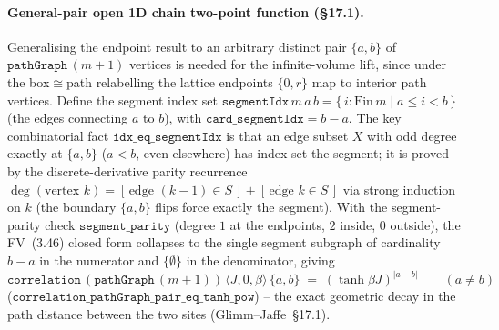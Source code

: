 \documentclass[a4paper,11pt]{article}
\begin{document}
\paragraph{General-pair open 1D chain two-point function (\S17.1).}
Generalising the endpoint result to an arbitrary distinct pair $\{a,b\}$ of
$\texttt{pathGraph}\,(m{+}1)$ vertices is needed for the infinite-volume lift, since
under the box$\cong$path relabelling the lattice endpoints $\{0,r\}$ map to interior
path vertices.  Define the segment index set
$\texttt{segmentIdx}\,m\,a\,b = \{\, i : \mathrm{Fin}\,m \mid a \le i < b \,\}$ (the
edges connecting $a$ to $b$), with $\texttt{card\_segmentIdx} = b - a$.  The key
combinatorial fact $\texttt{idx\_eq\_segmentIdx}$ is that an edge subset $X$ with odd
degree exactly at $\{a,b\}$ ($a < b$, even elsewhere) has index set the segment; it is
proved by the discrete-derivative parity recurrence
$\deg(\text{vertex }k) = [\,\text{edge }(k{-}1)\in S\,] + [\,\text{edge }k\in S\,]$ via
strong induction on $k$ (the boundary $\{a,b\}$ flips force exactly the segment).
With the segment-parity check $\texttt{segment\_parity}$ (degree $1$ at the endpoints,
$2$ inside, $0$ outside), the FV~(3.46) closed form collapses to the single segment
subgraph of cardinality $b-a$ in the numerator and $\{\emptyset\}$ in the denominator,
giving
\[
  \texttt{correlation}\,(\texttt{pathGraph}\,(m{+}1))\,\langle J,0,\beta\rangle\,
    \{a,b\} \;=\; (\tanh\beta J)^{\lvert a - b\rvert} \qquad (a \ne b)
\]
($\texttt{correlation\_pathGraph\_pair\_eq\_tanh\_pow}$) -- the exact geometric decay in
the path distance between the two sites (Glimm--Jaffe~\S17.1).
\end{document}
